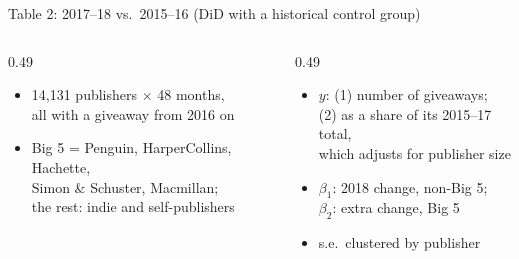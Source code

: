 \documentclass[aspectratio=169, 11pt, t, usepdftitle=false]{beamer}
\begin{document}
\begin{frame}{Table 2: 2017--18 vs.\ 2015--16 (DiD with a historical control group)}
  \vspace{0.4em}
  \begin{columns}[T,onlytextwidth]
    \begin{column}{0.49\textwidth}
      \small
      \begin{itemize}
        \item 14{,}131 publishers $\times$ 48 months,\\
          all with a giveaway from 2016 on
        \item Big 5 = Penguin, HarperCollins, Hachette,\\
          Simon \& Schuster, Macmillan;\\
          the rest: indie and self-publishers
      \end{itemize}
    \end{column}
    \begin{column}{0.49\textwidth}
      \small
      \begin{itemize}
        \item $y$: (1) number of giveaways;\\
          (2) as a share of its 2015--17 total,\\
          which adjusts for publisher size
        \item $\beta_1$: 2018 change, non-Big 5;\\
          $\beta_2$: extra change, Big 5
        \item s.e.\ clustered by publisher
      \end{itemize}
    \end{column}
  \end{columns}

\end{frame}
\end{document}
